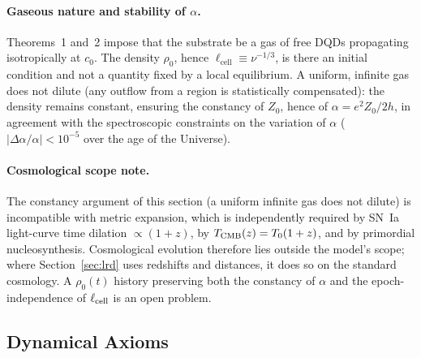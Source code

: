 \documentclass[11pt,a4paper]{article}
\theoremstyle{plain}
\theoremstyle{remark}
\begin{document}
\paragraph{Gaseous nature and stability of $\alpha$.} Theorems~1 and~2 impose that the substrate be a gas of free DQDs propagating isotropically at $c_0$. The density $\rho_0$, hence $\ell_{\text{cell}} \equiv \nu^{-1/3}$, is there an initial condition and not a quantity fixed by a local equilibrium. A uniform, infinite gas does not dilute (any outflow from a region is statistically compensated): the density remains constant, ensuring the constancy of $Z_0$, hence of $\alpha = e^2 Z_0/2h$, in agreement with the spectroscopic constraints on the variation of $\alpha$ ($|\Delta\alpha/\alpha| < 10^{-5}$ over the age of the Universe).

\paragraph{Cosmological scope note.} The constancy argument of this section (a uniform infinite gas does not dilute) is incompatible with metric expansion, which is independently required by SN~Ia light-curve time dilation $\propto (1+z)$, by $T_{\rm CMB}(z) = T_0(1+z)$, and by primordial nucleosynthesis. Cosmological evolution therefore lies outside the model's scope; where Section~\ref{sec:lrd} uses redshifts and distances, it does so on the standard cosmology. A $\rho_0(t)$ history preserving both the constancy of $\alpha$ and the epoch-independence of $\ell_{\rm cell}$ is an open problem.

\subsection{Dynamical Axioms}
\end{document}
